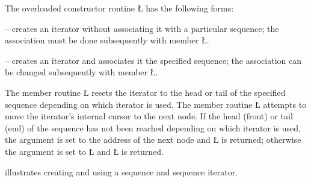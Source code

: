 \documentclass[openright,twoside]{report}
\begin{document}
The overloaded constructor routine \LGinlinetrue\LGbegin\lgrinde\L{}\endlgrinde\LGend{} has the following forms:
\begin{prefix}
\item[\LGinlinetrue\LGbegin\lgrinde\L{\LB{\V{uSeqIter}()}}\endlgrinde\LGend{}]
-- creates an iterator without associating it with a particular sequence;
the association must be done subsequently with member \LGinlinetrue\LGbegin\lgrinde\L{}\endlgrinde\LGend{}.

\item[\LGinlinetrue\LGbegin\lgrinde\L{\LB{\V{uSeqIter}(\0\K{const}\0\V{uSeq}\<\V{T}\>\0\&\0\V{q}\0)}}\endlgrinde\LGend{}]
-- creates an iterator and associates it the specified sequence;
the association can be changed subsequently with member \LGinlinetrue\LGbegin\lgrinde\L{}\endlgrinde\LGend{}.
\end{prefix}

The member routine \LGinlinetrue\LGbegin\lgrinde\L{}\endlgrinde\LGend{} resets the iterator to the head or tail of the specified sequence depending on which iterator is used.
The member routine \LGinlinetrue\LGbegin\lgrinde\L{\LB{\>\>}}\endlgrinde\LGend{} attempts to move the iterator's internal cursor to the next node.
If the head (front) or tail (end) of the sequence has not been reached depending on which iterator is used, the argument is set to the address of the next node and \LGinlinetrue\LGbegin\lgrinde\L{}\endlgrinde\LGend{} is returned;
otherwise the argument is set to \LGinlinetrue\LGbegin\lgrinde\L{}\endlgrinde\LGend{} and \LGinlinetrue\LGbegin\lgrinde\L{}\endlgrinde\LGend{} is returned.

 illustrates creating and using a sequence and sequence iterator.
\end{document}
